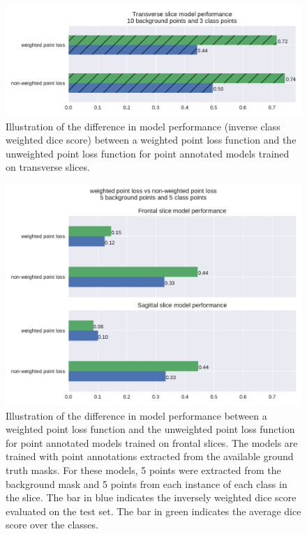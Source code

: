 \begin{figure}
    \centering
    \includegraphics[width=.95\textwidth]{images/weightedvsnonweighted_transverse.pdf}
    \caption{
        Illustration of the difference in model performance (inverse class weighted dice score) between a weighted point loss function and the unweighted point loss function for point annotated models trained on transverse slices.
        \protect
    \label{fig:weighted_vs_unweighted_transverse}}
\end{figure}%
\begin{figure}
    \centering
    \includegraphics[width=.95\textwidth]{images/weightedvsnonweighted.pdf}
    \caption{
        Illustration of the difference in model performance between a weighted point loss function and the unweighted point loss function for point annotated models trained on frontal slices.
        The models are trained with point annotations extracted from the available ground truth masks. For these models, 
        5 points were extracted from the background mask and 5 points from each instance of each class in the slice. 
        The bar in blue indicates the inversely weighted dice score evaluated on the test set. The bar in green indicates the average dice score over the classes.
        \protect
        \label{fig:weighted_vs_unweighted}}
\end{figure}

